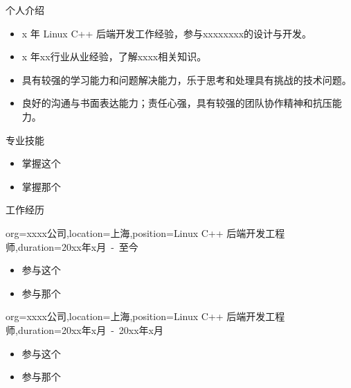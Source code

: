\documentclass{resume}
\begin{document}
\makeheader

\begin{ResumeSection}{个人介绍}
    \smallskip
    \begin{itemize}
        \item {x 年 Linux C++ 后端开发工作经验，参与xxxxxxxx的设计与开发。}
        \item {x 年xx行业从业经验，了解xxxx相关知识。}
        \item {具有较强的学习能力和问题解决能力，乐于思考和处理具有挑战的技术问题。}
        \item {良好的沟通与书面表达能力；责任心强，具有较强的团队协作精神和抗压能力。}
    \end{itemize}
    \bigskip
\end{ResumeSection}

\begin{ResumeSection}{专业技能}
    \smallskip
    \begin{itemize}
        \item {掌握这个}
        \item {掌握那个}
    \end{itemize}
    \bigskip
\end{ResumeSection}

\begin{ResumeSection}{工作经历}
    \begin{ResumeSubsection}{org={xxxx公司},location={上海},position={Linux C++ 后端开发工程师},duration={20xx年x月\ -\ 至今}}
        \begin{itemize}
            \item {参与这个}
            \item {参与那个}
        \end{itemize}
    \end{ResumeSubsection}

    \begin{ResumeSubsection}{org={xxxx公司},location={上海},position={Linux C++ 后端开发工程师},duration={20xx年x月\ -\ 20xx年x月}}
        \begin{itemize}
            \item {参与这个}
            \item {参与那个}
        \end{itemize}
    \end{ResumeSubsection}
\end{ResumeSection}
\end{document}
